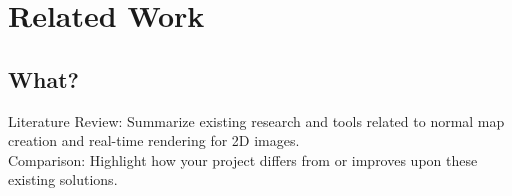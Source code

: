 \documentclass[format=sigconf, review=false, nonacm=true]{acmart}
\begin{document}




\appendix

\section{Related Work}

\subsection{What?}

Literature Review: Summarize existing research and tools related to normal map creation and real-time rendering for 2D images.\\
Comparison: Highlight how your project differs from or improves upon these existing solutions.
\end{document}
